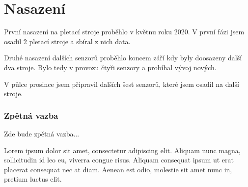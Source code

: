 \chapter{Nasazení}
První nasazení na pletací stroje proběhlo v květnu roku 2020.
V první fázi jsem osadil 2 pletací stroje a sbíral z nich data.

Druhé nasazení dalších senzorů proběhlo koncem září kdy byly doosazeny další dva stroje.
Bylo tedy v provozu čtyři senzory a probíhal vývoj nových.

V půlce prosince jsem připravil dalších šest senzorů, které jsem osadil na další stroje.


\subsection{Zpětná vazba}
Zde bude zpětná vazba...

Lorem ipsum dolor sit amet, consectetur adipiscing elit.
Aliquam nunc magna, sollicitudin id leo eu, viverra congue risus.
Aliquam consequat ipsum ut erat placerat consequat nec at diam. 
Aenean est odio, molestie sit amet nunc in, pretium luctus elit. 




\newpage